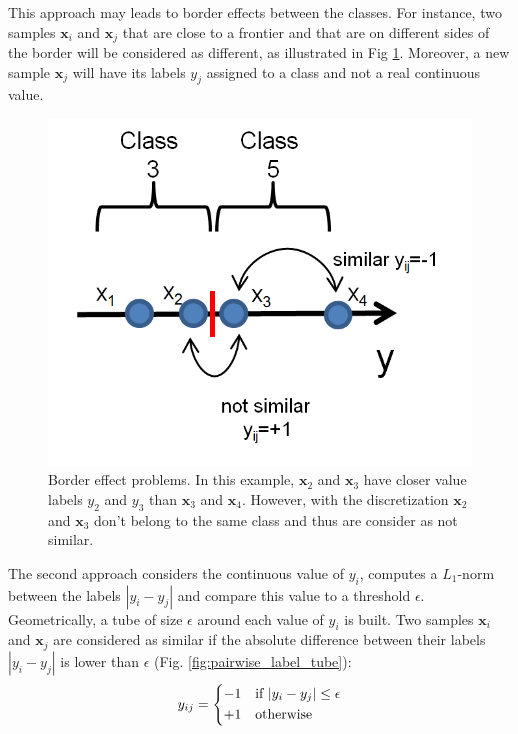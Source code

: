 \noindent This approach may leads to border effects between the classes. For instance, two samples $\textbf{x}_i$ and $\textbf{x}_j$ that are close to a frontier and that are on different sides of the border will be considered as different, as illustrated in Fig \ref{fig:Discretize_binning_border_effect}. Moreover, a new sample $\textbf{x}_j$ will have its labels $y_j$ assigned to a class and not a real continuous value. 

\begin{figure}[h!]
	\centering
	\includegraphics[width=0.35\linewidth]{images/Discretize_binning_border_effect}
	\caption[Border effect problems.]{Border effect problems. In this example, $\textbf{x}_2$ and $\textbf{x}_3$ have closer value labels $y_2$ and $y_3$ than $\textbf{x}_3$ and $\textbf{x}_4$. However, with the discretization $\textbf{x}_2$ and $\textbf{x}_3$ don't belong to the same class and thus are consider as not similar.}
	\label{fig:Discretize_binning_border_effect}
\end{figure}

\noindent The second approach considers the continuous value of $y_i$, computes a $L_1$-norm between the labels $|y_i-y_j|$ and compare this value to a threshold $\epsilon$. Geometrically, a tube of size $\epsilon$ around each value of $y_i$ is built. Two samples $\textbf{x}_i$ and  $\textbf{x}_j$ are considered as similar if the absolute difference between their labels $|y_i-y_j|$ is lower than $\epsilon$ (Fig. \ref{fig:pairwise_label_tube}):
\begin{equation}
y_{ij} = 
\left\{
\begin{split}
\begin{aligned}
-1 & \text{\quad if } |y_i-y_j| \leq \epsilon \\ 
+1 & \text{\quad otherwise }
\end{aligned} 
\end{split}
\right.
\end{equation}


